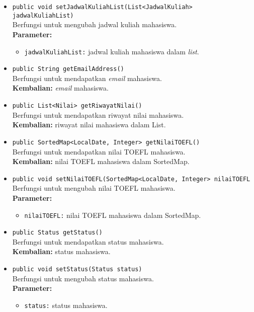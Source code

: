 \begin{itemize}
	\item \texttt{public void setJadwalKuliahList(List<JadwalKuliah> jadwalKuliahList)}\\
		Berfungsi untuk mengubah jadwal kuliah mahasiswa.\\
        \textbf{Parameter:}
		\begin{itemize}
			\item \texttt{jadwalKuliahList:} jadwal kuliah mahasiswa dalam \textit{list}.
		\end{itemize}	
		
	\item \texttt{public String getEmailAddress()}\\
		Berfungsi untuk mendapatkan \textit{email} mahasiswa.\\
		\textbf{Kembalian:} \textit{email} mahasiswa.
	
	\item \texttt{public List<Nilai> getRiwayatNilai()}\\
		Berfungsi untuk mendapatkan riwayat nilai mahasiswa.\\
		\textbf{Kembalian:} riwayat nilai mahasiswa dalam List.
		
	\item \texttt{public SortedMap<LocalDate, Integer> getNilaiTOEFL()}\\
	Berfungsi untuk mendapatkan nilai TOEFL mahasiswa.\\
	\textbf{Kembalian:} nilai TOEFL mahasiswa dalam SortedMap.
	
	\item \texttt{public void setNilaiTOEFL(SortedMap<LocalDate, Integer> nilaiTOEFL}\\
	Berfungsi untuk mengubah nilai TOEFL mahasiswa.\\
    \textbf{Parameter:}
		\begin{itemize}
			\item \texttt{nilaiTOEFL:} nilai TOEFL mahasiswa dalam SortedMap.
		\end{itemize}		
		
	\item \texttt{public Status getStatus()}\\
	Berfungsi untuk mendapatkan status mahasiswa.\\
	\textbf{Kembalian:} status mahasiswa.
	
	\item \texttt{public void setStatus(Status status)}\\
	Berfungsi untuk mengubah status mahasiswa.\\
        \textbf{Parameter:}
		\begin{itemize}
			\item \texttt{status:} status mahasiswa.
		\end{itemize}	
		

\end{itemize}
